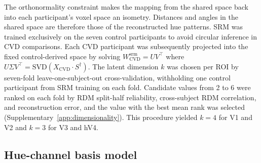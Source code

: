 The orthonormality constraint makes the mapping from the shared space back into each participant's voxel space an isometry. Distances and angles in the shared space are therefore those of the reconstructed hue patterns. SRM was trained exclusively on the seven control participants to avoid circular inference in CVD comparisons. Each CVD participant was subsequently projected into the fixed control-derived space by solving $W^{\mathrm{srm}}_\text{CVD} = UV^\top$ where $U\Sigma V^\top = \text{SVD}(X_\text{CVD}\cdot S^\dagger)$. The latent dimension $k$ was chosen per ROI by seven-fold leave-one-subject-out cross-validation, withholding one control participant from SRM training on each fold. Candidate values from 2 to 6 were ranked on each fold by RDM split-half reliability, cross-subject RDM correlation, and reconstruction error, and the value with the best mean rank was selected (Supplementary~\cref{app:dimensionality}). This procedure yielded $k = 4$ for V1 and V2 and $k = 3$ for V3 and hV4.

\subsection{Hue-channel basis model}
\label{sec:methods:encoding}

